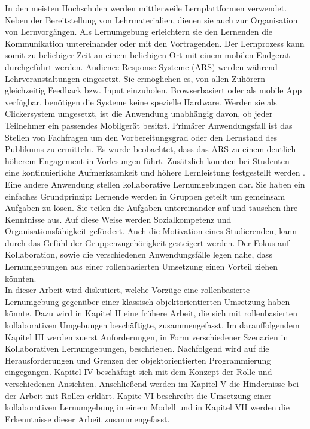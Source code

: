 \documentclass[conference]{IEEEtran}
\begin{document}
In den meisten Hochschulen werden mittlerweile Lernplattformen verwendet. Neben der Bereitstellung von Lehrmaterialien, dienen sie auch zur Organisation von Lernvorgängen. Als Lernumgebung erleichtern sie den Lernenden die Kommunikation untereinander oder mit den Vortragenden. Der Lernprozess kann somit zu beliebiger Zeit an einem beliebigen Ort mit einem mobilen Endgerät durchgeführt werden. Audience Response Systeme (ARS) werden während Lehrveranstaltungen eingesetzt. Sie ermöglichen es, von allen Zuhörern gleichzeitig Feedback bzw. Input einzuholen. Browserbasiert oder als mobile App verfügbar, benötigen die Systeme keine spezielle Hardware. Werden sie als Clickersystem umgesetzt, ist die Anwendung unabhängig davon, ob jeder Teilnehmer ein passendes Mobilgerät besitzt. Primärer Anwendungsfall ist das Stellen von Fachfragen um den Vorbereitungsgrad oder den Lernstand des Publikums zu ermitteln. Es wurde beobachtet, dass das ARS zu einem deutlich höherem Engagement in Vorlesungen führt. Zusätzlich konnten bei Studenten eine kontinuierliche Aufmerksamkeit und höhere Lernleistung festgestellt werden \cite{digitaleHochschule}. Eine andere Anwendung stellen kollaborative Lernumgebungen dar. Sie haben ein einfaches Grundprinzip: Lernende werden in Gruppen geteilt um gemeinsam Aufgaben zu lösen. Sie teilen die Aufgaben untereinander auf und tauschen ihre Kenntnisse aus. Auf diese Weise werden Sozialkompetenz und Organisationsfähigkeit gefördert. Auch die Motivation eines Studierenden, kann durch das Gefühl der Gruppenzugehörigkeit gesteigert werden. Der Fokus auf Kollaboration, sowie die verschiedenen Anwendungsfälle legen nahe, dass Lernumgebungen aus einer rollenbasierten Umsetzung einen Vorteil ziehen könnten. \\ In dieser Arbeit wird diskutiert, welche Vorzüge eine rollenbasierte Lernumgebung gegenüber einer klassisch objektorientierten Umsetzung haben könnte. Dazu wird in Kapitel II eine frühere Arbeit, die sich mit rollenbasierten kollaborativen Umgebungen beschäftigte, zusammengefasst. Im darauffolgendem Kapitel III werden zuerst Anforderungen, in Form verschiedener Szenarien in Kollaborativen Lernumgebungen, beschrieben. Nachfolgend wird auf die Herausforderungen und Grenzen der objektorientierten Programmierung eingegangen. Kapitel IV beschäftigt sich mit dem Konzept der Rolle und verschiedenen Ansichten. Anschließend werden im Kapitel V die Hindernisse bei der Arbeit mit Rollen erklärt. Kapite VI beschreibt die Umsetzung einer kollaborativen Lernumgebung in einem Modell und in Kapitel VII werden die Erkenntnisse dieser Arbeit zusammengefasst.
\end{document}
